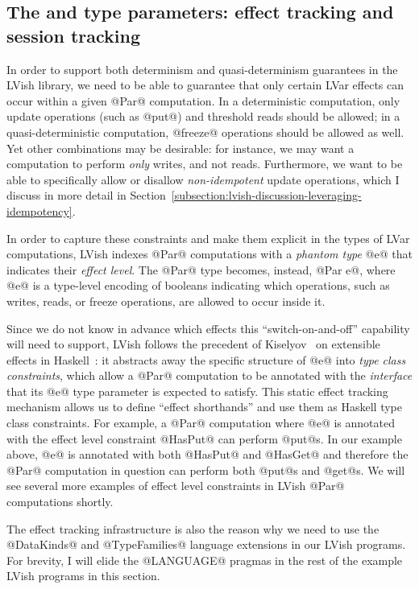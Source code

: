 \subsection{The  and  type parameters: effect tracking and session tracking}

In order to support both determinism and quasi-determinism guarantees
in the LVish library, we need to be able to guarantee that only
certain LVar effects can occur within a given @Par@ computation.  In a
deterministic computation, only update operations (such as @put@) and
threshold reads should be allowed; in a quasi-deterministic
computation, @freeze@ operations should be allowed as well.  Yet other
combinations may be desirable: for instance, we may want a computation
to perform \emph{only} writes, and not reads.  Furthermore, we want to
be able to specifically allow or disallow \emph{non-idempotent} update
operations, which I discuss in more detail in
Section~\ref{subsection:lvish-discussion-leveraging-idempotency}.

In order to capture these constraints and make them explicit in the
types of LVar computations, LVish indexes @Par@ computations with a
\emph{phantom type} @e@ that indicates their \emph{effect level}.  The
@Par@ type becomes, instead, @Par e@, where @e@ is a type-level
encoding of booleans indicating which operations, such as writes,
reads, or freeze operations, are allowed to occur inside it.


Since we do not know in advance which effects this
``switch-on-and-off'' capability will need to support, LVish follows
the precedent of Kiselyov \etal~on extensible effects in
Haskell~\cite{oleg-amr-haskell-2013}: it abstracts away the specific
structure of @e@ into \emph{type class constraints}, which allow a
@Par@ computation to be annotated with the \emph{interface} that its
@e@ type parameter is expected to satisfy.  This static effect
tracking mechanism allows us to define ``effect shorthands'' and use
them as Haskell type class constraints.  For example, a @Par@
computation where @e@ is annotated with the effect level constraint
@HasPut@ can perform @put@s.  In our example above, @e@ is annotated
with both @HasPut@ and @HasGet@ and therefore the @Par@ computation in
question can perform both @put@s and @get@s.  We will see several more
examples of effect level constraints in LVish @Par@ computations
shortly.

The effect tracking infrastructure is also the reason why we need to
use the @DataKinds@ and @TypeFamilies@ language extensions in our
LVish programs.  For brevity, I will elide the @LANGUAGE@ pragmas in
the rest of the example LVish programs in this section.  

